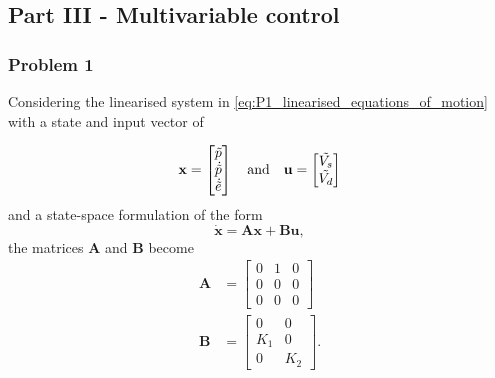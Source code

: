 \subsection{Part III - Multivariable control}\label{subsec:part3}
\subsubsection{Problem 1}

Considering the linearised system in \cref{eq:P1_linearised_equations_of_motion} with a state and input vector of  

\begin{equation}\label{eq:P3_state_vector_and_input}
    \mathbf{x}=
    \begin{bmatrix}
        \tilde{p}\\
        \dot{\tilde{p}}\\
        \dot{\tilde{e}}
    \end{bmatrix}
    \quad\text{and}\quad
    \mathbf{u}=
    \begin{bmatrix}
        \tilde{V_s}\\
        \tilde{V_d}
    \end{bmatrix}
\end{equation}
and a state-space formulation of the form
\begin{equation}\label{eq:P3_state_space_equation}
    \dot{\mathbf{x}}=\mathbf{Ax}+\mathbf{Bu},
\end{equation}
the matrices $\mathbf{A}$ and $\mathbf{B}$ become 
\begin{subequations}\label{eq:P3_p1_A_B}
    \begin{align}
        \mathbf{A}&=
            \begin{bmatrix}
                0&1&0\\
                0&0&0\\
                0&0&0
            \end{bmatrix}\label{eq:P3_p1_A} \\
        \mathbf{B}&=
            \begin{bmatrix}
                0&0\\
                K_1&0\\
                0&K_2
            \end{bmatrix}\label{eq:P3_p1_B}.
    \end{align}
\end{subequations}
\clearpage
